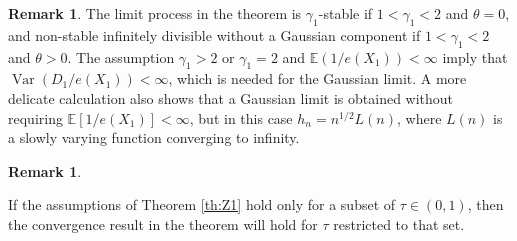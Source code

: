 \documentclass[12pt]{amsart}
\newcommand{\1}{\mathbbm{1}}
\newcommand{\0}{\mathbf{0}}
\newcommand{\E}{\mathbb{E}}
\theoremstyle{plain}
\theoremstyle{definition}
\newtheorem{remark}[theorem]{Remark}
\begin{document}
\begin{remark}
\label{rem:Gaussian_case}
       The limit process in the theorem is  $\gamma_1$-stable if $1<\gamma_1<2$ and $\theta=0$, and non-stable infinitely divisible without a Gaussian component if $1<\gamma_1<2$ and $\theta>0$.  The assumption $\gamma_1>2$ or $\gamma_1=2$ and $\E(1/e(X_1))<\infty$ imply that $\operatorname{Var}(D_1/e(X_1))<\infty$, which is needed for the Gaussian limit.  A more delicate calculation also shows that a Gaussian limit is obtained without requiring $\E[1/e(X_1)]<\infty$, but in this case $h_n=n^{1/2}L(n)$, where $L(n)$ is a slowly varying function converging to infinity. 
   \end{remark}

\begin{remark} \label{rk:some.tau}

If the assumptions of Theorem 
\ref{th:Z1} hold only for a subset of $\tau\in (0,1)$, then the convergence result in the theorem will hold for $\tau$ restricted to that set. 
\end{remark}
\end{document}
